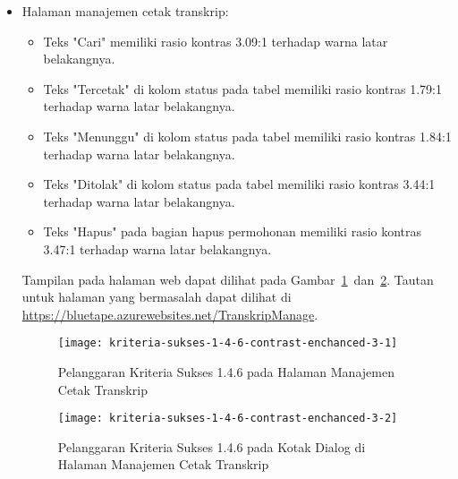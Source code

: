 \begin{itemize}
    \item Halaman manajemen cetak transkrip: 
    \begin{itemize}
        \item Teks "Cari" memiliki rasio kontras 3.09:1 terhadap warna latar belakangnya.
        \item Teks "Tercetak" di kolom status pada tabel memiliki rasio kontras 1.79:1 terhadap warna latar belakangnya.
        \item Teks "Menunggu" di kolom status pada tabel memiliki rasio kontras 1.84:1 terhadap warna latar belakangnya.
        \item Teks "Ditolak" di kolom status pada tabel memiliki rasio kontras 3.44:1 terhadap warna latar belakangnya.
        \item Teks "Hapus" pada bagian hapus permohonan memiliki rasio kontras 3.47:1 terhadap warna latar belakangnya.
    \end{itemize}
    Tampilan pada halaman web dapat dilihat pada \mbox{Gambar \ref{fig:1.4.6_contrast_enchanced_3_1} dan \ref{fig:1.4.6_contrast_enchanced_3_2}}. Tautan untuk halaman yang bermasalah dapat dilihat di \url{https://bluetape.azurewebsites.net/TranskripManage}.
    \begin{figure}[H]
        \centering  
        \texttt{[image: kriteria-sukses-1-4-6-contrast-enchanced-3-1]}  
        \caption[Pelanggaran Kriteria Sukses 1.4.6 pada Halaman Manajemen Cetak Transkrip ]{Pelanggaran Kriteria Sukses 1.4.6 pada Halaman Manajemen Cetak Transkrip}
        \label{fig:1.4.6_contrast_enchanced_3_1}  
    \end{figure} 
    
    \begin{figure}[H]
        \centering  
        \texttt{[image: kriteria-sukses-1-4-6-contrast-enchanced-3-2]}  
        \caption[Pelanggaran Kriteria Sukses 1.4.6 pada Kotak Dialog di Halaman Manajemen Cetak Transkrip]{Pelanggaran Kriteria Sukses 1.4.6 pada Kotak Dialog di Halaman Manajemen Cetak Transkrip}
        \label{fig:1.4.6_contrast_enchanced_3_2}  
    \end{figure} 


\end{itemize}
